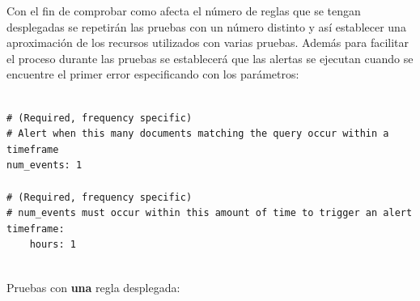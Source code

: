 Con el fin de comprobar como afecta el número de reglas que se tengan desplegadas se repetirán las pruebas con un número distinto y así establecer una aproximación de los recursos utilizados con varias pruebas. Además para facilitar el proceso durante las pruebas se establecerá que las alertas se ejecutan cuando se encuentre el primer error especificando con los parámetros:

\begin{verbatim}

# (Required, frequency specific)
# Alert when this many documents matching the query occur within a timeframe
num_events: 1

# (Required, frequency specific)
# num_events must occur within this amount of time to trigger an alert
timeframe:
    hours: 1
    
\end{verbatim}

Pruebas con \textbf{una} regla desplegada:


